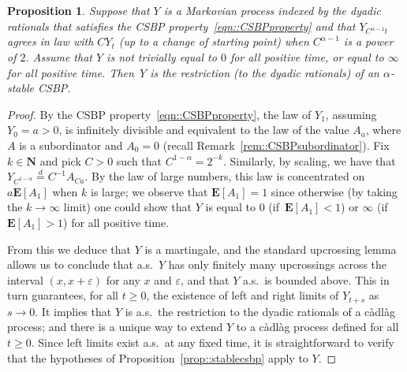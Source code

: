 \documentclass[10pt]{amsart}
\let\epsilon\varepsilon
\theoremstyle{plain}
\numberwithin{theorem}{section}
\newtheorem{proposition}[theorem]{Proposition}
\theoremstyle{definition}
\newcommand \E {{\mathbf E}}
\newcommand{\N}{\mathbf{N}}
\newcommand{\cadlag}{càdlàg}
\begin{document}
\begin{proposition}
\label{prop::strongstablecsbp}
Suppose that $Y$ is a Markovian process indexed by the dyadic rationals that satisfies the CSBP property~\eqref{eqn::CSBPproperty} and that $Y_{C^{\alpha-1} t}$ agrees in law with $C Y_t$ (up to a change of starting point) when $C^{\alpha-1}$ is a power of $2$. Assume that $Y$ is not trivially equal to $0$ for all positive time, or equal to $\infty$ for all positive time. Then~$Y$ is the restriction (to the dyadic rationals) of an $\alpha$-stable CSBP.
\end{proposition}
\begin{proof}
By the CSBP property~\eqref{eqn::CSBPproperty}, the law of $Y_1$, assuming $Y_0 = a > 0$, is infinitely divisible and equivalent to the law of the value $A_a$, where $A$ is a subordinator and $A_0 = 0$ (recall Remark~\ref{rem::CSBPsubordinator}). Fix $k \in \N$ and pick $C > 0$ such that $C^{1-\alpha} = 2^{-k}$. Similarly, by scaling, we have that $Y_{C^{1-\alpha}} \stackrel{d}{=} C^{-1}A_{Ca}$. By the law of large numbers, this law is concentrated on $a \E[A_1]$ when $k$ is large; we observe that $\E[A_1] = 1$ since otherwise (by taking the $k \to \infty$ limit) one could show that $Y$ is equal to $0$ (if~$\E[A_1] < 1$) or $\infty$ (if $\E[A_1] > 1$) for all positive time.

From this we deduce that $Y$ is a martingale, and the standard upcrossing lemma allows us to conclude that a.s.\ $Y$ has only finitely many upcrossings across the interval $(x, x+\epsilon)$ for any $x$ and $\epsilon$, and that $Y$ a.s.\ is bounded above. This in turn guarantees, for all $t \geq 0$, the existence of left and right limits of $Y_{t+s}$ as $s \to 0$. It implies that $Y$ is a.s.\ the restriction to the dyadic rationals of a {\cadlag} process; and there is a unique way to extend $Y$ to a {\cadlag} process defined for all $t \geq 0$. Since left limits exist a.s.\ at any fixed time, it is straightforward to verify that the hypotheses of Proposition~\ref{prop::stablecsbp} apply to $Y$.
\end{proof}
\end{document}

